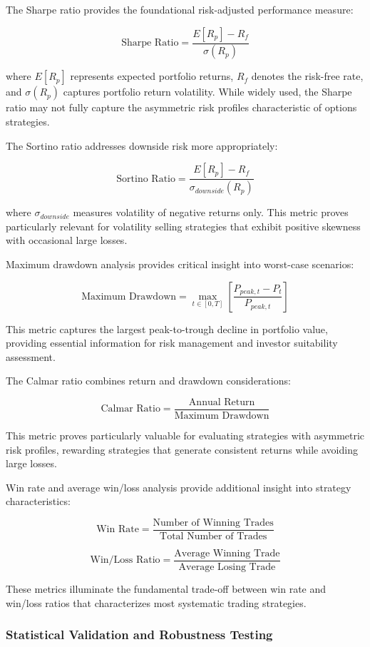 \documentclass[
  american,
  11pt,
  11pt,
  letterpaper,
  onecolumn]{article}
\begin{document}
The Sharpe ratio provides the foundational risk-adjusted performance
measure:

\[\text{Sharpe Ratio} = \frac{E[R_p] - R_f}{\sigma(R_p)}\]

where \(E[R_p]\) represents expected portfolio returns, \(R_f\) denotes
the risk-free rate, and \(\sigma(R_p)\) captures portfolio return
volatility. While widely used, the Sharpe ratio may not fully capture
the asymmetric risk profiles characteristic of options strategies.

The Sortino ratio addresses downside risk more appropriately:

\[\text{Sortino Ratio} = \frac{E[R_p] - R_f}{\sigma_{downside}(R_p)}\]

where \(\sigma_{downside}\) measures volatility of negative returns
only. This metric proves particularly relevant for volatility selling
strategies that exhibit positive skewness with occasional large losses.

Maximum drawdown analysis provides critical insight into worst-case
scenarios:

\[\text{Maximum Drawdown} = \max_{t \in [0,T]} \left[\frac{P_{peak,t} - P_t}{P_{peak,t}}\right]\]

This metric captures the largest peak-to-trough decline in portfolio
value, providing essential information for risk management and investor
suitability assessment.

The Calmar ratio combines return and drawdown considerations:

\[\text{Calmar Ratio} = \frac{\text{Annual Return}}{\text{Maximum Drawdown}}\]

This metric proves particularly valuable for evaluating strategies with
asymmetric risk profiles, rewarding strategies that generate consistent
returns while avoiding large losses.

Win rate and average win/loss analysis provide additional insight into
strategy characteristics:

\[\text{Win Rate} = \frac{\text{Number of Winning Trades}}{\text{Total Number of Trades}}\]

\[\text{Win/Loss Ratio} = \frac{\text{Average Winning Trade}}{\text{Average Losing Trade}}\]

These metrics illuminate the fundamental trade-off between win rate and
win/loss ratios that characterizes most systematic trading strategies.

\subsubsection{Statistical Validation and Robustness
Testing}\label{statistical-validation-and-robustness-testing}
\end{document}
